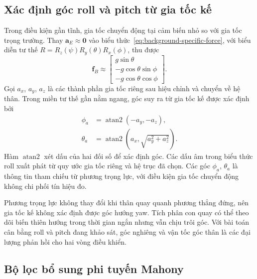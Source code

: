 \subsection{Xác định góc roll và pitch từ gia tốc kế}
\label{subsec:background-accelerometer-angles}

Trong điều kiện gần tĩnh, gia tốc chuyển động tại cảm biến nhỏ so với gia tốc trọng trường. Thay $\mathbf a_E\approx\mathbf 0$ vào biểu thức~\eqref{eq:background-specific-force}, với biểu diễn tư thế $R=R_z(\psi)R_y(\theta)R_x(\phi)$, thu được
\begin{equation}
    \mathbf f_B\approx
    \begin{bmatrix}
        g\sin\theta\\
        -g\cos\theta\sin\phi\\
        -g\cos\theta\cos\phi
    \end{bmatrix}.
    \label{eq:background-gravity-components}
\end{equation}
Gọi $a_x$, $a_y$, $a_z$ là các thành phần gia tốc riêng sau hiệu chỉnh và chuyển về hệ thân. Trong miền tư thế gần nằm ngang, góc suy ra từ gia tốc kế được xác định bởi
\begin{equation}
    \begin{aligned}
        \phi_a&=\operatorname{atan2}(-a_y,-a_z),\\
        \theta_a&=\operatorname{atan2}
        \left(a_x,\sqrt{a_y^2+a_z^2}\right).
    \end{aligned}
    \label{eq:background-accelerometer-angles}
\end{equation}
Hàm $\operatorname{atan2}$ xét dấu của hai đối số để xác định góc. Các dấu âm trong biểu thức roll xuất phát từ quy ước gia tốc riêng và hệ trục đã chọn. Các góc $\phi_a$, $\theta_a$ là thông tin tham chiếu từ phương trọng lực, với điều kiện gia tốc chuyển động không chi phối tín hiệu đo.

Phương trọng lực không thay đổi khi thân quay quanh phương thẳng đứng, nên gia tốc kế không xác định được góc hướng yaw. Tích phân con quay có thể theo dõi biến thiên hướng trong thời gian ngắn nhưng vẫn chịu trôi góc. Với bài toán cân bằng roll và pitch đang khảo sát, góc nghiêng và vận tốc góc thân là các đại lượng phản hồi cho hai vòng điều khiển.

\subsection{Bộ lọc bổ sung phi tuyến Mahony}
\label{subsec:background-mahony}

